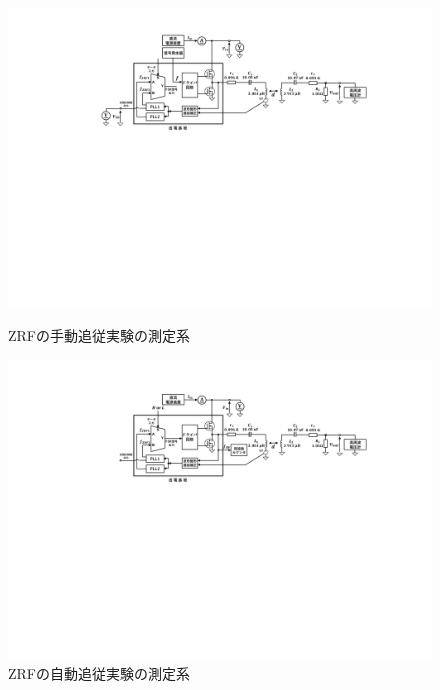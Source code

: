 \begin{figure}[h]
\begin{center}
\includegraphics[width=160mm]{figures/manual.pdf}
\caption{ZRFの手動追従実験の測定系}
\label{manual}
\vspace{1cm}

\includegraphics[width=160mm]{figures/auto.pdf}
\caption{ZRFの自動追従実験の測定系}
\label{auto}

\end{center}
\end{figure}

